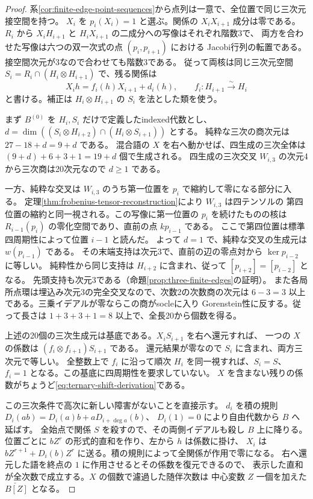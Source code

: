 \begin{proof}
系\ref{cor:finite-edge-point-sequences}から点列は一意で、全位置で同じ三次元接空間を持つ。
$X_i$ を $p_i(X_i)=1$ と選ぶ。関係の $X_iX_{i+1}$ 成分は零である。
$R_i$ から $X_iH_{i+1}$ と $H_i X_{i+1}$ の二成分への写像はそれぞれ階数3で、
両方を合わせた写像は六つの双一次式の点 $(p_i,p_{i+1})$ における
Jacobi行列の転置である。接空間次元が3なので合わせても階数3である。
従って両核は同じ三次元空間 $S_i=R_i\cap(H_i\otimes H_{i+1})$ で、残る関係は
\[
 X_i h=f_i(h)X_{i+1}+d_i(h),\qquad f_i:H_{i+1}\xrightarrow{\sim}H_i
\]
と書ける。補正は $H_i\otimes H_{i+1}$ の $S_i$ を法とした類を使う。

まず $B^{(0)}$ を $H_i,S_i$ だけで定義したindexed代数とし、
$d=\dim((S_i\otimes H_{i+2})\cap(H_i\otimes S_{i+1}))$ とする。
純粋な三次の商次元は $27-18+d=9+d$ である。
混合語の $X$ を右へ動かせば、四生成の三次全体は
$(9+d)+6+3+1=19+d$ 個で生成される。
四生成の三次交叉 $W_{i,3}$ の次元4から三次商は20次元なので $d\ge1$ である。

一方、純粋な交叉は $W_{i,3}$ のうち第一位置を $p_i$ で縮約して零になる部分に入る。
定理\ref{thm:frobenius-tensor-reconstruction}により $W_{i,3}$ は四テンソルの
第四位置の縮約と同一視される。この写像に第一位置の $p_i$ を続けたものの核は
$R_{i-1}(p_i)$ の零化空間であり、直前の点 $kp_{i-1}$ である。
ここで第四位置は標準四周期性によって位置 $i-1$ と読んだ。
よって $d=1$ で、純粋な交叉の生成元は $w(p_{i-1})$ である。
その末端支持は次元3で、直前の辺の零点対から $\ker p_{i-2}$ に等しい。
純粋性から同じ支持は $H_{i+2}$ に含まれ、従って $[p_{i+2}]=[p_{i-2}]$ となる。
先頭支持も次元3である（命題\ref{prop:three-finite-edges}の証明）。
また各局所点環は埋込み次元3の完全交叉なので、次数2の次数商の次元は
$6-3=3$ 以上である。三乗イデアルが零ならこの商がsocleに入り
Gorenstein性に反する。従って長さは $1+3+3+1=8$ 以上で、全長20から個数を得る。

上述の20個の三次生成元は基底である。$X_i S_{i+1}$ を右へ還元すれば、
一つの $X$ の係数は $(f_i\otimes f_{i+1})S_{i+1}$ である。
還元結果が零なので $S_i$ に含まれ、両方三次元で等しい。
全整数上で $f_i$ に沿って順次 $H_i$ を同一視すれば、$S_i=S$、
$f_i=1$ となる。この基底に四周期性を要求していない。
$X$ を含まない残りの係数がちょうど\eqref{eq:ternary-shift-derivation}である。

この三次条件で高次に新しい障害がないことを直接示す。
$d_i$ を積の規則 $D_i(ab)=D_i(a)b+a D_{i+\deg a}(b)$、
$D_i(1)=0$ により自由代数から $B$ へ延ばす。
全始点で関係 $S$ を殺すので、その両側イデアルも殺し $B$ 上に降りる。
位置ごとに $bZ^r$ の形式的直和を作り、左から $h$ は係数に掛け、
$X_i$ は $bZ^{r+1}+D_i(b)Z^r$ に送る。積の規則によって全関係が作用で零になる。
右へ還元した語を終点の $1$ に作用させるとその係数を復元できるので、
表示した直和が全次数で成立する。$X$ の個数で濾過した随伴次数は
中心変数 $Z$ 一個を加えた $\check{B[Z]}$ となる。


\end{proof}
